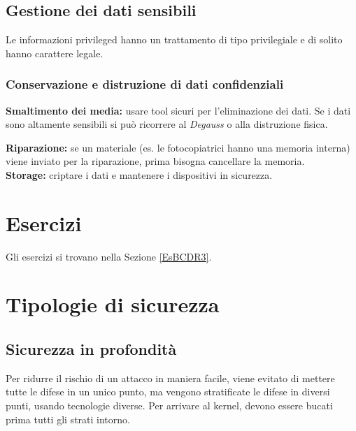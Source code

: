 \subsection{Gestione dei dati sensibili}

Le informazioni privileged hanno un trattamento di tipo privilegiale e di
solito hanno carattere legale.

\subsubsection{Conservazione e distruzione di dati confidenziali}

\textbf{Smaltimento dei media:} usare tool sicuri per l'eliminazione dei dati.
Se i dati sono altamente sensibili si può ricorrere al \textit{Degauss} o alla
distruzione fisica.\\
\newline

\textbf{Riparazione:} se un materiale (es. le fotocopiatrici hanno una memoria
interna) viene inviato per la riparazione, prima bisogna cancellare la memoria.
\\
\newline
\textbf{Storage:} criptare i dati e mantenere i dispositivi in sicurezza.

\section{Esercizi}

Gli esercizi si trovano nella Sezione \ref{EsBCDR3}.

\section{Tipologie di sicurezza}

\subsection{Sicurezza in profondità}

Per ridurre il rischio di un attacco in maniera facile, viene evitato di
mettere tutte le difese in un unico punto, ma vengono stratificate le difese in
diversi punti, usando tecnologie diverse.
Per arrivare al kernel, devono essere bucati prima tutti gli strati intorno.
